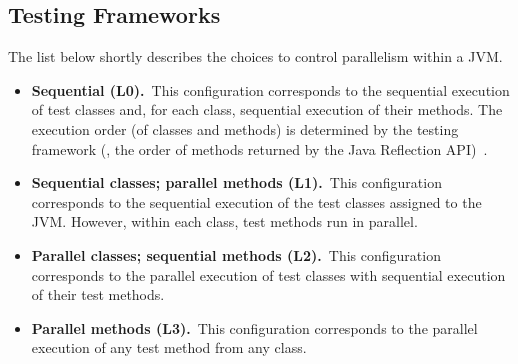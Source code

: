 


\subsection{Testing Frameworks}
\label{sec:frameworks}

The list below shortly describes the choices to control parallelism
within a JVM.

\newcommand{\Seq}{L0}
\newcommand{\ParClassSeqMeth}{L1}
\newcommand{\SeqClassParMeth}{L2}
\newcommand{\ParClassParMeth}{L3}

\begin{itemize}
\item
    \textbf{Sequential (\Seq).}~This configuration corresponds to the
    sequential execution of test classes and, for each class,
    sequential execution of their methods.  The execution order (of
    classes and methods) is determined by the testing framework (\eg,
    the order of methods returned by the Java Reflection
    API)~\cite{junit-test-order}.
\item
    \textbf{Sequential classes; parallel methods
      (\ParClassSeqMeth{}).}~This configuration corresponds to the
    sequential execution of the test classes assigned to the JVM.
    However, within each class, test methods run in parallel.
\item
    \textbf{Parallel classes; sequential methods
      (\SeqClassParMeth{}).}~This configuration corresponds to the
    parallel execution of test classes with sequential execution of
    their test methods.
\item
    \textbf{Parallel methods (\ParClassParMeth).}~This configuration
    corresponds to the parallel execution of any test method from any
    class.
\end{itemize}

